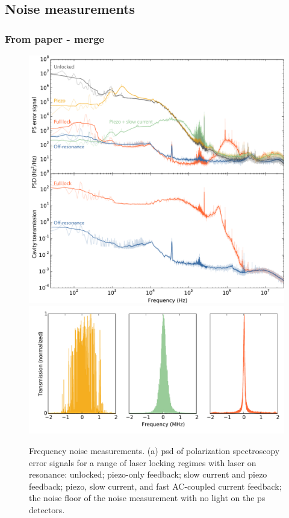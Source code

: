 \subsection{Noise measurements}
\subsubsection{From paper - merge}
\begin{figure}[htbp]
\centering
    \includegraphics[width=0.9\linewidth]{chapter1/Figs/fig4a_v3.pdf}
    \label{fig:PSDs}
    \includegraphics[width=0.9\linewidth]{chapter1/Figs/fig4b_v1.pdf}
    \label{fig:cavity_scans}
\caption{Frequency noise measurements.
(a) \Gls*{psd} of polarization spectroscopy error signals for a range of laser locking regimes with laser on resonance: unlocked; piezo-only feedback; slow current and piezo feedback; piezo, slow current, and fast AC-coupled current feedback; the noise floor of the noise measurement with no light on the \gls*{ps} detectors.
}
\end{figure}
